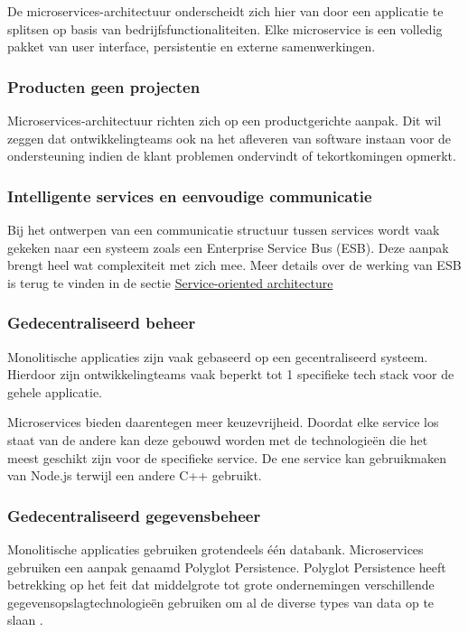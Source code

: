 De microservices-architectuur onderscheidt zich hier van door een applicatie te splitsen op basis van bedrijfsfunctionaliteiten. Elke microservice is een volledig pakket van user interface, persistentie en externe samenwerkingen.

\subsubsection{Producten geen projecten}

Microservices-architectuur richten zich op een productgerichte aanpak. Dit wil zeggen dat ontwikkelingteams ook na het afleveren van software instaan voor de ondersteuning indien de klant problemen ondervindt of tekortkomingen opmerkt.

\subsubsection{Intelligente services en eenvoudige communicatie}

Bij het ontwerpen van een communicatie structuur tussen services wordt vaak gekeken naar een systeem zoals een Enterprise Service Bus (ESB). Deze aanpak brengt heel wat complexiteit met zich mee. Meer details over de werking van ESB is terug te vinden in de sectie \hyperref[sec:soa]{Service-oriented architecture}

\subsubsection{Gedecentraliseerd beheer}

Monolitische applicaties zijn vaak gebaseerd op een gecentraliseerd systeem. Hierdoor zijn ontwikkelingteams vaak beperkt tot 1 specifieke tech stack voor de gehele applicatie.

Microservices bieden daarentegen meer keuzevrijheid. Doordat elke service los staat van de andere kan deze gebouwd worden met de technologieën die het meest geschikt zijn voor de specifieke service. De ene service kan gebruikmaken van Node.js terwijl een andere C++ gebruikt.

\subsubsection{Gedecentraliseerd gegevensbeheer}

Monolitische applicaties gebruiken grotendeels één databank. Microservices gebruiken een aanpak genaamd Polyglot Persistence. Polyglot Persistence heeft betrekking op het feit dat middelgrote tot grote ondernemingen verschillende gegevensopslagtechnologieën gebruiken om al de diverse types van data op te slaan \autocite{Fowler2011}.

